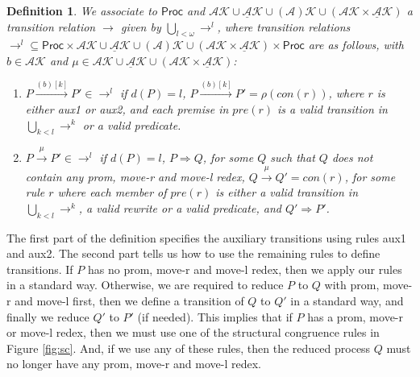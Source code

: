 \documentclass[review]{elsarticle}
\newcommand{\Proc}{\mathsf{Proc}}
\newcommand{\tran}[1]{\stackrel{#1}{\rightarrow}}
\newcommand{\mAK}{\mathcal{AK}}
\newcommand{\aAK}{\mathcal{(A)K}}
\newcommand{\umAK}{\underline{\mathcal{A}}\mathcal{K}}
\newcommand{\rulename}[1]{\textsf{#1}}
\newtheorem{definition}{Definition}
\begin{document}
\begin{definition}\label{LTS} \normalfont
We associate to $\Proc$ and $\mAK \cup \umAK \cup \aAK \cup (\mAK \times \umAK)$
a transition relation
$\rightarrow$ given by $ \bigcup_{l<\omega} \rightarrow^l$, where transition relations
$\rightarrow^l \subseteq \Proc \times \mAK \cup \umAK \cup \aAK \cup (\mAK \times \umAK) \times \Proc$
are as follows, with $b\in \mAK$ and $\mu \in \mAK \cup \umAK \cup (\mAK \times \umAK)$:

\begin{enumerate}
\item
$P \xrightarrow{(b)[k]} P' \in \rightarrow^l$ if $d(P)=l$,
$P \xrightarrow{(b)[k]} P'= \rho(con(r))$, where $r$ is either \rulename{aux1} or \rulename{aux2},
and each premise in $pre(r)$ is a valid transition in $\bigcup_{k<l} \rightarrow^k$ or a valid predicate.

\item $P \tran{\mu} P'\in \rightarrow^l$ if $d(P)=l$, $P\Rightarrow Q$, for some $Q$ such that $Q$
does not contain any \rulename{prom}, \rulename{move-r} and \rulename{move-l} redex,  $Q \tran{\mu} Q'= con(r)$,
for some rule $r$ where each member of $pre(r)$ is either a valid transition
in $ \bigcup_{k<l} \rightarrow^k$, a valid rewrite or a valid predicate, and $Q'\Rightarrow P'$.

\end{enumerate}

\end{definition}


The first part of the definition specifies the auxiliary transitions using rules \rulename{aux1} and 
\rulename{aux2}. The second
part tells us how to use the remaining rules to define transitions. If $P$ has no \rulename{prom}, 
\rulename{move-r} and \rulename{move-l} redex, then we apply our rules in a standard way. Otherwise, we are 
required to reduce $P$ to $Q$ with \rulename{prom}, \rulename{move-r} and \rulename{move-l} first, 
then we define a transition of $Q$ to $Q'$
in a standard way, and finally we reduce $Q'$ to $P'$ (if needed). This implies that 
if $P$ has a \rulename{prom}, \rulename{move-r} or \rulename{move-l} redex, then we must use one 
of the structural congruence rules in Figure \ref{fig:sc}. 
And, if we use any of these rules, then the reduced process $Q$ must no longer have any 
\rulename{prom}, \rulename{move-r} and \rulename{move-l} redex. 
\end{document}
